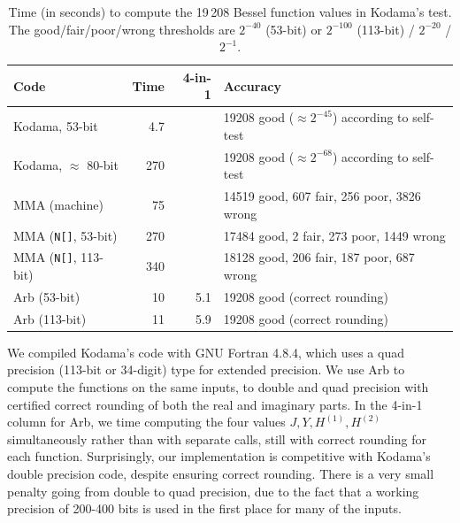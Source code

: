 \documentclass[11pt]{article}
\begin{document}
\begin{table}
\renewcommand{\arraystretch}{1.1}
\setlength{\tabcolsep}{.4em}
\begin{center}
\begin{small}
\begin{tabular}{l | r r | l}
Code               & Time  & 4-in-1 &  Accuracy  \\ \hline
Kodama, 53-bit     & 4.7  &   &  19208 good ($\approx 2^{-45}$) according to self-test          \\
Kodama, $\approx$ 80-bit   & 270  &   &  19208 good ($\approx 2^{-68}$) according to self-test          \\ \hline
MMA (machine)            & 75  &   &  14519 good, 607 fair, 256 poor, 3826 wrong \\
MMA (\texttt{N[]}, 53-bit)           & 270   &  &  17484 good, 2 fair,   273 poor, 1449 wrong \\
MMA (\texttt{N[]}, 113-bit)           & 340  &   &  18128 good, 206 fair, 187 poor, 687 wrong \\ \hline
Arb (53-bit)       & 10  & 5.1  &  19208 good (correct rounding) \\
Arb (113-bit)      & 11  & 5.9  &  19208 good (correct rounding) \\
\end{tabular}
\end{small}
\caption{Time (in seconds) to compute the 19\,208 Bessel function values in Kodama's test.
The good/fair/poor/wrong thresholds are $2^{-40}$ (53-bit) or $2^{-100}$ (113-bit) / $2^{-20}$ / $2^{-1}$.}
\label{tab:kodama}
\end{center}
\end{table}

We compiled Kodama's code with GNU Fortran 4.8.4, which uses a quad precision
(113-bit or 34-digit) type for extended precision.
We use Arb to compute the functions on the same
inputs, to double and quad precision
with certified correct rounding of both the real and imaginary parts.
In the 4-in-1 column for Arb, we time
computing the four values $J, Y, H^{(1)}, H^{(2)}$ simultaneously rather than with
separate calls, still with correct rounding for each function.
Surprisingly, our implementation is competitive with Kodama's double
precision code,
despite ensuring correct rounding.
There is a very small penalty going from double to quad precision,
due to the fact that a working precision of 200-400 bits is used
in the first place for many of the inputs.
\end{document}
